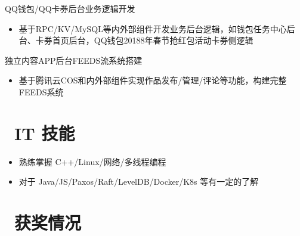 \documentclass{resume}
\begin{document}
\begin{onehalfspacing}
QQ钱包/QQ卡券后台业务逻辑开发
\begin{itemize}
  \item 基于RPC/KV/MySQL等内外部组件开发业务后台逻辑，如钱包任务中心后台、卡券首页后台，QQ钱包20188年春节抢红包活动卡券侧逻辑
\end{itemize}

独立内容APP后台FEEDS流系统搭建
\begin{itemize}
  \item 基于腾讯云COS和内外部组件实现作品发布/管理/评论等功能，构建完整FEEDS系统
\end{itemize}
\end{onehalfspacing}

\section{\faCogs\ IT 技能}
\begin{itemize}[parsep=0.5ex]
  \item 熟练掌握 C++/Linux/网络/多线程编程
  \item 对于 Java/JS/Paxos/Raft/LevelDB/Docker/K8s 等有一定的了解
\end{itemize}

\section{\faHeartO\ 获奖情况}


%
%
\end{document}

